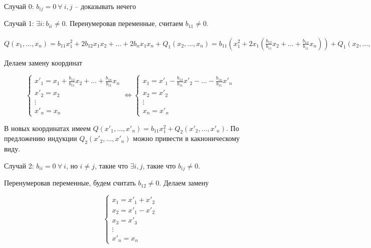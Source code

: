 Случай 0: $b_{ij} = 0 \ \forall \ i,j$ -- доказывать нечего

Случай 1: $\exists i : b_{ii} \neq 0$. Перенумеровав переменные, считаем $b_{11} \neq 0$.

$Q(x_1, \dots, x_n) = b_{11} x_1^2 + 2b_{12} x_1 x_2 + \dots + 2b_n x_1 x_n + Q_1(x_2, \dots, x_n) = b_{11}(x_1^2 + 2x_1(\frac{b_{12}}{b_{11}} x_2 + \dots + \frac{b_{1n}}{b_{11}} x_n )) + Q_1(x_2, \dots, x_n) = b_{11} (x_1 + \frac{b{12}}{b_{11}} x_2 + \dots + \frac{b_{1n}}{b_{11}} x_n)^2 - b_{11} (\frac{b_{12}}{b_{11}} x_2 + \dots + \frac{b_{12}}{b_{11}} + \dots + \frac{b_{1n}}{b_{11}} x_n) ^2 + Q_1(x_2, \dots, x_n)$

Делаем замену координат

\begin{equation*}
 \begin{cases}
		x'_1 = x_1 + \frac{b_{12}}{b_{11}} x_2 + \dots + \frac{b_{1n}}{b_{11}} x_n \\
		x'_2 = x_2 \\
        \vdots \\
        x'_n = x_n
	\end{cases} \Leftrightarrow \begin{cases}
		x_1 = x'_1 - \frac{b_{12}}{b_{11}} x'_2 - \dots - \frac{b_{1n}}{b_{11}} x'_n \\
		x_2 = x'_2 \\
        \vdots \\
        x_n = x'_n
	\end{cases}
\end{equation*}

В новых координатах имеем $Q(x'_1, \dots, x'_n) = b_{11}x_1^2 + Q_2 (x'_2, \dots, x'_n)$. По предложению индукции $Q_2(x'_2, \dots, x'_n)$ можно привести в какноническому виду.

Случай 2: $b_{ii} = 0 \ \forall \ i$, но $i \neq j$, такие что $\exists i, j$, такие что $b_{ij} \neq 0$.

Перенумеровав переменные, будем считать $b_{12} \neq 0$. Делаем замену 

\begin{equation*}
\begin{cases}
		x_1 = x'_1 + x'_2 \\
		x_2 = x'_1 - x'_2 \\
        x_3 = x'_3 \\
        \vdots \\
        x'_n = x_n
	\end{cases}
\end{equation*}

